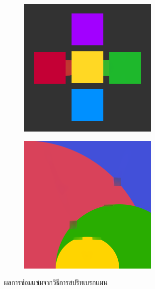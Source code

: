 \begin{figure}[H]
\begin{subfigure}{\ResultSubFigureWidth \linewidth}
	\end{subfigure}
	\begin{subfigure}{\ResultSubFigureWidth \linewidth}
		\centering
		\includegraphics[width=\ResultSubFigurePadding \linewidth]{image/result_ex1/splitbergman04.png}			
	\end{subfigure}
	\begin{subfigure}{\ResultSubFigureWidth \linewidth}
		\centering
		\includegraphics[width=\ResultSubFigurePadding \linewidth]{image/result_ex1/splitbergman05.png}			
	\end{subfigure}
	\caption{ผลการซ่อมแซมจากวิธีการสปริทเบรกแมน}
	\label{figure:result-splitbregman}
\end{figure}